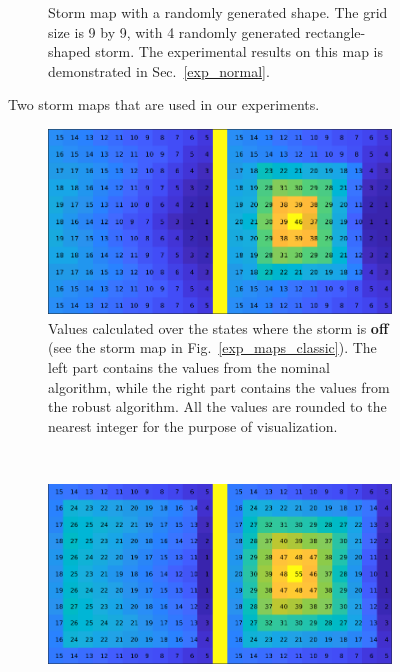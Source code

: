 \documentclass[11pt,reqno]{amsart}
\theoremstyle{definition}
\numberwithin{equation}{section}
\theoremstyle{remark}
\begin{document}
\begin{figure}
\begin{subfigure}{0.5\linewidth}
    \caption{Storm map with a randomly generated shape. The grid size is 9 by 9, with 4 randomly generated rectangle-shaped storm. The experimental results on this map is demonstrated in Sec.~\ref{exp_normal}.}
    \label{exp_maps_normal}
\end{subfigure}
\caption{Two storm maps that are used in our experiments.}
\label{exp_maps}
\end{figure}

\begin{figure}
\centering
\begin{subfigure}{1\linewidth}
    \centering
    \includegraphics[width=0.99\linewidth]{images/values_classic_nostorm.png}
    \caption{Values calculated over the states where the storm is \textbf{off} (see the storm map in Fig.~\ref{exp_maps_classic}). The left part contains the values from the nominal algorithm, while the right part contains the values from the robust algorithm. All the values are rounded to the nearest integer for the purpose of visualization.}
    \label{exp_values_nostorm}
\end{subfigure}
\\
\begin{subfigure}{1\linewidth}
    \centering
    \includegraphics[width=0.99\linewidth]{images/values_classic_storm.png}

\end{subfigure}
\end{figure}
\end{document}
